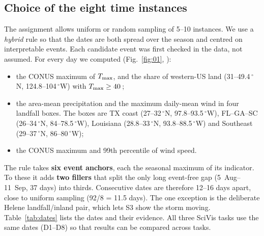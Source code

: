 \subsection{Choice of the eight time instances}
\label{sec:dates}
The assignment allows uniform or random sampling of 5--10 instances. We use a \emph{hybrid} rule so that the dates are
both spread over the season and centred on interpretable events. Each candidate event was first checked in the
data, not assumed. For every day we computed (Fig.~\ref{fig:01}, ):
\begin{itemize}
\item the CONUS maximum of $T_{\max}$, and the share of western-US land (31--49.4\,$^\circ$N, 124.8--104\,$^\circ$W) with
  $T_{\max}\ge40$\,\degC;
\item the area-mean precipitation and the maximum daily-mean wind in four landfall boxes. The boxes are TX coast
  (27--32\,$^\circ$N, 97.8--93.5\,$^\circ$W), FL--GA--SC (26--34\,$^\circ$N, 84--78.5\,$^\circ$W), Louisiana
  (28.8--33\,$^\circ$N, 93.8--88.5\,$^\circ$W) and Southeast (29--37\,$^\circ$N, 86--80\,$^\circ$W);
\item the CONUS maximum and 99th percentile of wind speed.
\end{itemize}
The rule takes \textbf{six event anchors}, each the seasonal maximum of its indicator. To these it adds \textbf{two
fillers} that split the only long event-free gap (5~Aug--11~Sep, 37 days) into thirds. Consecutive dates are therefore
12--16 days apart, close to uniform sampling (92/8 = 11.5 days). The one exception is the deliberate Helene
landfall/inland pair, which lets S3 show the storm moving. Table~\ref{tab:dates} lists the dates and their evidence. All
three SciVis tasks use the same dates (D1--D8) so that results can be compared across tasks.




